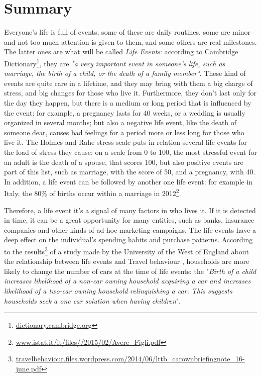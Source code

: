 \chapter*{Summary} %
\label{summary}
Everyone's life is full of events, some of these are daily routines, some are minor and not too much attention is given to them, and some others are real milestones. The latter ones are what will be called \emph{Life Events}: according to Cambridge Dictionary\footnote{\url{dictionary.cambridge.org}}, they are \textit{"a very important event in someone's life, such as marriage, the birth of a child, or the death of a family member"}. These kind of events are quite rare in a lifetime, and they may bring with them a big charge of stress, and big changes for those who live it. Furthermore, they don't last only for the day they happen, but there is a medium or long period that is influenced by the event: for example, a pregnancy lasts for 40 weeks, or a wedding is usually organized in several months; but also a negative life event, like the death of someone dear, causes bad feelings for a period more or less long for those who live it. The Holmes and Rahe stress scale \cite{holmes1967social} puts in relation several life events for the load of stress they cause: on a scale from 0 to 100, the most stressful event for an adult is the death of a spouse, that scores 100, but also positive events are part of this list, such as marriage, with the score of 50, and a pregnancy, with 40. In addition, a life event can be followed by another one life event: for example in Italy, the 80\% of births occur within a marriage in 2012\footnote{\url{www.istat.it/it/files//2015/02/Avere_Figli.pdf}}.

Therefore, a life event it's a signal of many factors in who lives it. If it is detected in time, it can be a great opportunity for many entities, such as banks, insurance companies and other kinds of ad-hoc marketing campaigns. The life events have a deep effect on the individual's spending habits and purchase patterns. According to the results\footnote{\url{travelbehaviour.files.wordpress.com/2014/06/lttb_carownbriefingnote_16-june.pdf}} of a study made by the University of the West of England about the relationship between life events and Travel behaviour \cite{chatterjee2015facts}, households are more likely to change the number of cars at the time of life events: the "\textit{Birth of a child increases likelihood of a non-car owning household acquiring a car and increases likelihood of a two-car owning household relinquishing a car. This suggests households seek a one car solution when having children}".

